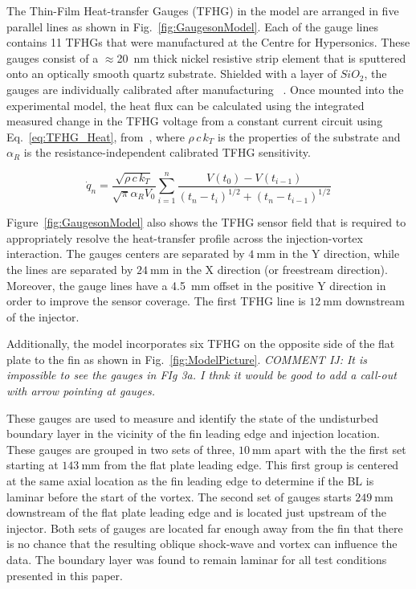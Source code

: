 \documentclass{AIAA}
\begin{document}
The Thin-Film Heat-transfer Gauges (TFHG) in the model are arranged in five parallel lines as shown in Fig.~\ref{fig:GaugesonModel}.
Each of the gauge lines contains 11 TFHGs that were manufactured at the Centre for Hypersonics.
These gauges consist of a $\approx$\SI{20}{\nano\meter} thick nickel resistive strip element that is sputtered onto an optically smooth quartz substrate.
Shielded with a layer of $SiO_2$, the gauges are individually calibrated after manufacturing ~\cite{Wise_Thesis}.
Once mounted into the experimental model, the heat flux can be calculated using the integrated measured change in the TFHG voltage from a constant current circuit using Eq.~\ref{eq:TFHG_Heat}, from~\cite{Wise_Thesis,Schultz_Book}, where $\rho \, c \, k_T$ is the properties of the substrate and $\alpha_R$ is the resistance-independent calibrated TFHG sensitivity.

\begin{equation}
\dot{q}_n = \frac{\sqrt{\rho \, c \, k_T}}{\sqrt{\pi}\alpha_R V_0}\sum^n_{i=1}\frac{V\left(t_0\right)-V\left(t_{i-1}\right)}{\left(t_n-t_i\right)^{1/2}+\left(t_n-t_{i-1}\right)^{1/2}}
\label{eq:TFHG_Heat} 
\end{equation}



Figure~\ref{fig:GaugesonModel} also shows the TFHG sensor field that is required to appropriately resolve the heat-transfer profile across the injection-vortex interaction.
The gauges centers are separated by $\SI{4}{\milli\meter}$ in the Y direction, while the lines are separated by $\SI{24}{\milli\meter}$ in the X direction (or freestream direction).
Moreover, the gauge lines have a \SI{4.5}{\milli\meter} offset in the positive Y direction in order to improve the sensor coverage.
The first TFHG line is $\SI{12}{\milli\meter}$ downstream of the injector.


Additionally, the model incorporates six TFHG on the opposite side of the  flat plate to the fin as shown in Fig.~\ref{fig:ModelPicture}.
{\it COMMENT IJ: It is impossible to see the gauges in FIg 3a. I thnk it would be good to add a call-out with arrow pointing at gauges.}

These gauges are used to measure and identify the state of the undisturbed boundary layer in the vicinity of the fin leading edge and injection location.
These gauges are grouped in two sets of three, $\SI{10}{\milli\meter}$ apart with the 
the first set starting at $\SI{143}{\milli\meter}$ from the flat plate leading edge.
This first group is centered at the same axial location as the fin leading edge to determine if the BL is laminar before the start of the vortex.
The second set of gauges starts $\SI{249}{\milli\meter}$ downstream of the flat plate leading edge and is located just upstream of the injector.
Both sets of gauges are located far enough away from the fin that there is no chance that the resulting oblique shock-wave and vortex can influence the data.
The boundary layer was found to remain laminar for all test conditions presented in this paper.
\end{document}
